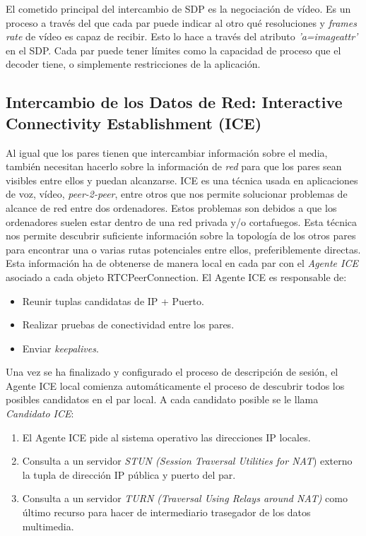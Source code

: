 El cometido principal del intercambio de SDP es la negociación de vídeo. Es un proceso a través del que cada par puede indicar al otro qué resoluciones y \textit{frames rate} de vídeo es capaz de recibir. Esto lo hace a través del atributo \textit{'a=imageattr'} en el SDP. Cada par puede tener límites como la capacidad de proceso que el decoder tiene, o simplemente restricciones de la aplicación.\\


\subsection{Intercambio de los Datos de Red: Interactive Connectivity Establishment (ICE)}

Al igual que los pares tienen que intercambiar información sobre el media, también necesitan hacerlo sobre la información de \textit{red} para que los pares sean visibles entre ellos y puedan alcanzarse. ICE es una técnica usada en aplicaciones de voz, vídeo, \emph{peer-2-peer}, entre otros que nos permite solucionar problemas de alcance de red entre dos ordenadores. Estos problemas son debidos a que los ordenadores suelen estar dentro de una red privada y/o cortafuegos. Esta técnica nos permite descubrir suficiente información sobre la topología de los otros pares para encontrar una o varias rutas potenciales entre ellos, preferiblemente directas.\\

Esta información ha de obtenerse de manera local en cada par con el \textit{Agente ICE} asociado a cada objeto RTCPeerConnection. El Agente ICE es responsable de: 

\begin{itemize}
\item Reunir tuplas candidatas de IP + Puerto.
\item Realizar pruebas de conectividad entre los pares.
\item Enviar \textit{keepalives}.
\end{itemize}

Una vez se ha finalizado y configurado el proceso de descripción de sesión, el Agente ICE local comienza automáticamente el proceso de descubrir todos los posibles candidatos en el par local. A cada candidato posible se le llama \textit{Candidato ICE}:

\begin{enumerate}
\item El Agente ICE pide al sistema operativo las direcciones IP locales.
\item Consulta a un servidor \emph{STUN (Session Traversal Utilities for NAT}) externo la tupla de dirección IP pública y puerto del par.
\item Consulta a un servidor \emph{TURN (Traversal Using Relays around NAT)} como último recurso para hacer de intermediario trasegador de los datos multimedia. 
\end{enumerate}

